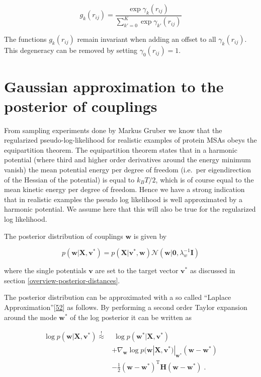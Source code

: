 \documentclass[12pt,a4paper,twoside]{book}
\newcommand{\Gauss}{\mathcal{N}}
\renewcommand{\H}{\mathbf{H}}
\newcommand{\I}{\mathbf{I}}
\newcommand{\rij}{r_{ij}}
\renewcommand{\v}{\mathbf{v}}
\newcommand{\w}{\mathbf{w}}
\newcommand{\X}{\mathbf{X}}
\theoremstyle{definition}
\theoremstyle{definition}
\theoremstyle{remark}
\begin{document}
\begin{equation}
    g_k(\rij) = \frac{\exp \gamma_k(\rij)}{\sum_{k'=0}^K \exp \gamma_{k'}(\rij)} 
\label{eq:def-g-k-binary}
\end{equation}

The functions \(g_k(\rij)\) remain invariant when adding an offset to
all \(\gamma_k(\rij)\). This degeneracy can be removed by setting
\(\gamma_0(\rij)=1\).

\section{Gaussian approximation to the posterior of
couplings}\label{laplace-approx}

From sampling experiments done by Markus Gruber we know that the
regularized pseudo-log-likelihood for realistic examples of protein MSAs
obeys the equipartition theorem. The equipartition theorem states that
in a harmonic potential (where third and higher order derivatives around
the energy minimum vanish) the mean potential energy per degree of
freedom (i.e.~per eigendirection of the Hessian of the potential) is
equal to \(k_B T/2\), which is of course equal to the mean kinetic
energy per degree of freedom. Hence we have a strong indication that in
realistic examples the pseudo log likelihood is well approximated by a
harmonic potential. We assume here that this will also be true for the
regularized log likelihood.

The posterior distribution of couplings \(\w\) is given by

\begin{equation}
p(\w | \X , \v^*) = p(\X | \v^*, \w) \Gauss (\w | \mathbf{0}, \lambda_w^{-1} \I)
\end{equation}

where the single potentials \(\v\) are set to the target vector \(\v^*\)
as discussed in section \ref{overview-posterior-distances}.

The posterior distribution can be approximated with a so called
``Laplace Approximation''{[}\protect\hyperlink{ref-Murphy2012}{52}{]} as
follows. By performing a second order Taylor expansion around the mode
\(\w^*\) of the log posterior it can be written as

\begin{align}
    \log p(\w | \X , \v^*) \overset{!}{\approx} &  \;  \log p(\w^* | \X , \v^*) \\
                & + \nabla_\w \log p(\w | \X , \v^*)|_{\w^*}(\w-\w^*) \\ 
                & - \frac{1}{2} (\w-\w^*)^{\mathrm{T}} \H (\w-\w^*)  \; .
\end{align}
\end{document}
